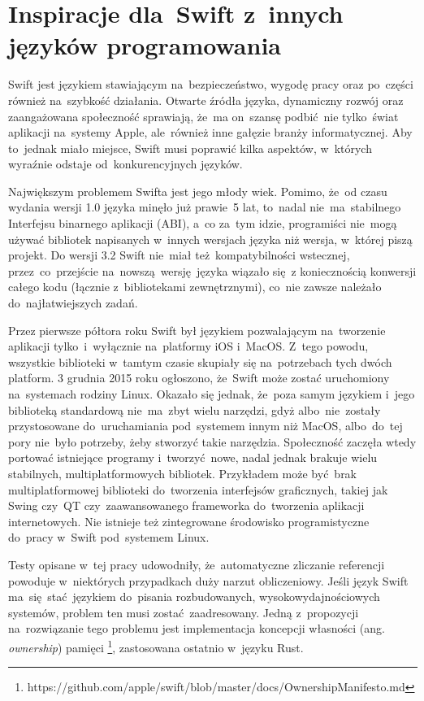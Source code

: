 \documentclass[mgr, shortabstract]{iithesis}
\newcommand{\ang}[1]{ang. \textit{#1}}
\begin{document}
\section{Inspiracje dla~Swift z~innych języków programowania}

Swift jest językiem stawiającym na~bezpieczeństwo, wygodę pracy oraz po~części również na~szybkość działania. Otwarte źródła języka, dynamiczny rozwój oraz zaangażowana społeczność sprawiają, że~ma on~szansę podbić nie tylko~świat aplikacji na~systemy Apple, ale~również inne gałęzie branży informatycznej. Aby to~jednak miało miejsce, Swift musi poprawić kilka aspektów, w~których wyraźnie odstaje od~konkurencyjnych języków.

Największym problemem Swifta jest jego młody wiek. Pomimo, że~od czasu wydania wersji 1.0 języka minęło już prawie 5 lat, to~nadal nie~ma~stabilnego Interfejsu binarnego aplikacji (ABI), a~co za~tym idzie, programiści nie~mogą używać bibliotek napisanych w~innych wersjach języka niż wersja, w~której piszą projekt. Do wersji 3.2 Swift nie~miał też kompatybilności wstecznej, przez~co~przejście na~nowszą wersję języka wiązało się z koniecznością konwersji całego kodu (łącznie z~bibliotekami zewnętrznymi), co~nie zawsze należało do~najłatwiejszych zadań.

Przez pierwsze półtora roku Swift był językiem pozwalającym na~tworzenie aplikacji tylko~i~wyłącznie na~platformy iOS i~MacOS. Z~tego powodu, wszystkie biblioteki w~tamtym czasie skupiały się na~potrzebach tych dwóch platform. 3 grudnia 2015 roku ogłoszono, że~Swift może zostać uruchomiony na~systemach rodziny Linux. Okazało się jednak, że~poza samym językiem i~jego biblioteką standardową nie~ma~zbyt wielu narzędzi, gdyż albo~nie~zostały przystosowane do~uruchamiania pod~systemem innym niż MacOS, albo~do~tej pory nie~było potrzeby, żeby stworzyć takie narzędzia. Społeczność zaczęła wtedy portować istniejące programy i~tworzyć nowe, nadal jednak brakuje wielu stabilnych, multiplatformowych bibliotek. Przykładem może być brak multiplatformowej biblioteki do~tworzenia interfejsów graficznych, takiej jak Swing czy~QT czy~zaawansowanego frameworka do~tworzenia aplikacji internetowych. Nie istnieje też zintegrowane środowisko programistyczne do~pracy w~Swift pod~systemem Linux.

Testy opisane w~tej pracy udowodniły, że~automatyczne zliczanie referencji powoduje w~niektórych przypadkach duży narzut obliczeniowy. Jeśli język Swift ma~się stać językiem do~pisania rozbudowanych, wysokowydajnościowych systemów, problem ten musi zostać zaadresowany. Jedną z~propozycji na~rozwiązanie tego problemu jest implementacja koncepcji własności (\ang{ownership}) pamięci \footnote{https://github.com/apple/swift/blob/master/docs/OwnershipManifesto.md}, zastosowana ostatnio w~języku Rust. 
\end{document}
